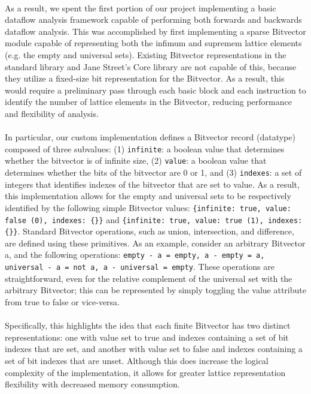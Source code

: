 \documentclass[letterpaper,11pt]{article}
\begin{document}
\paragraph{}
As a result, we spent the first portion of our project implementing a basic
dataflow analysis framework capable of performing both forwards and backwards
dataflow analysis. This was accomplished by first implementing a sparse
Bitvector module capable of representing both the infimum and supremem lattice
elements (e.g. the empty and universal sets). Existing Bitvector
representations in the standard library and Jane Street’s Core library are not
capable of this, because they utilize a fixed-size bit representation for the
Bitvector. As a result, this would require a preliminary pass through each
basic block and each instruction to identify the number of lattice elements in
the Bitvector, reducing performance and flexibility of analysis.

\paragraph{}
In particular, our custom implementation defines a Bitvector record (datatype)
composed of three subvalues: (1) \texttt{infinite}: a boolean value that determines
whether the bitvector is of infinite size, (2) \texttt{value}: a boolean value that
determines whether the bits of the bitvector are 0 or 1, and (3) \texttt{indexes}: a set
of integers that identifies indexes of the bitvector that are set to value. As
a result, this implementation allows for the empty and universal sets to be
respectively identified by the following simple Bitvector values: \texttt{\{infinite:
true, value: false (0), indexes: \{\}\}} and \texttt{\{infinite: true, value: true (1),
indexes: \{\}\}}. Standard Bitvector operations, such as union, intersection, and
difference, are defined using these primitives. As an example, consider an
arbitrary Bitvector a, and the following operations: \texttt{empty - a = empty, a -
empty = a, universal - a = not a, a - universal = empty}. These operations are
straightforward, even for the relative complement of the universal set with the
arbitrary Bitvector; this can be represented by simply toggling the value
attribute from true to false or vice-versa.

\paragraph{}
Specifically, this highlights the idea that each finite Bitvector has two
distinct representations: one with value set to true and indexes containing a
set of bit indexes that are set, and another with value set to false and
indexes containing a set of bit indexes that are unset. Although this does
increase the logical complexity of the implementation, it allows for greater
lattice representation flexibility with decreased memory consumption.
\end{document}
